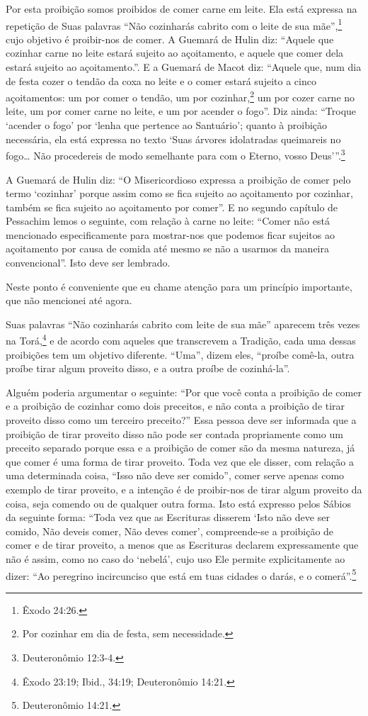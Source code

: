 Por esta proibição somos proibidos de comer carne em leite. Ela está
expressa na repetição de Suas palavras ``Não cozinharás cabrito com o
leite de sua mãe'',\footnote{Êxodo 24:26.} cujo objetivo é proibir-nos de comer.
A Guemará de Hulin diz: ``Aquele que cozinhar carne no leite estará
sujeito ao açoitamento, e aquele que comer dela estará sujeito ao
açoitamento.''. E a Guemará de Macot diz: ``Aquele que, num dia de festa
cozer o tendão da coxa no leite e o comer estará sujeito a cinco
açoitamentos: um por comer o tendão, um por
cozinhar,\footnote{Por cozinhar em dia de festa, sem necessidade.} um por cozer carne no leite, um por
comer carne no leite, e um por acender o fogo''. Diz ainda: ``Troque
`acender o fogo' por `lenha que pertence ao Santuário'; quanto à
proibição necessária, ela está expressa no texto `Suas árvores
idolatradas queimareis no fogo\ldots{} Não procedereis de modo semelhante
para com o Eterno, vosso Deus'''.\footnote{Deuteronômio 12:3-4.}

A Guemará de Hulin diz: ``O Misericordioso expressa a proibição de comer
pelo termo `cozinhar' porque assim como se fica sujeito ao açoitamento
por cozinhar, também se fica sujeito ao açoitamento por comer''. E no
segundo capítulo de Pessachim lemos o seguinte, com relação à carne no
leite: ``Comer não está mencionado especificamente para mostrar-nos que
podemos ficar sujeitos ao açoitamento por causa de comida até mesmo se
não a usarmos da maneira convencional''. Isto deve ser lembrado.

Neste ponto é conveniente que eu chame atenção para um princípio
importante, que não mencionei até agora.

Suas palavras ``Não cozinharás cabrito com leite de sua mãe'' aparecem
três vezes na Torá,\footnote{Êxodo 23:19; Ibid., 34:19; Deuteronômio 14:21.} e de acordo com aqueles que
transcrevem a Tradição, cada uma dessas proibições tem um objetivo
diferente. ``Uma'', dizem eles, ``proíbe comê-la, outra proíbe tirar
algum proveito disso, e a outra proíbe de cozinhá-la''.

Alguém poderia argumentar o seguinte: ``Por que você conta a proibição
de comer e a proibição de cozinhar como dois preceitos, e não conta a
proibição de tirar proveito disso como um terceiro preceito?'' Essa
pessoa deve ser informada que a proibição de tirar proveito disso não
pode ser contada propriamente como um preceito separado porque essa e a
proibição de comer são da mesma natureza, já que comer é uma forma de
tirar proveito. Toda vez que ele disser, com relação a uma determinada
coisa, ``Isso não deve ser comido'', comer serve apenas como exemplo de
tirar proveito, e a intenção é de proibir-nos de tirar algum proveito da
coisa, seja comendo ou de qualquer outra forma. Isto está expresso pelos
Sábios da seguinte forma: ``Toda vez que as Escrituras disserem `Isto
não deve ser comido, Não deveis comer, Não deves comer', compreende-se a
proibição de comer e de tirar proveito, a menos que as Escrituras
declarem expressamente que não é assim, como no caso do `nebelá', cujo
uso Ele permite explicitamente ao dizer: ``Ao peregrino incircunciso que está em tuas cidades o darás, e o comerá''.\footnote{Deuteronômio 14:21.}

